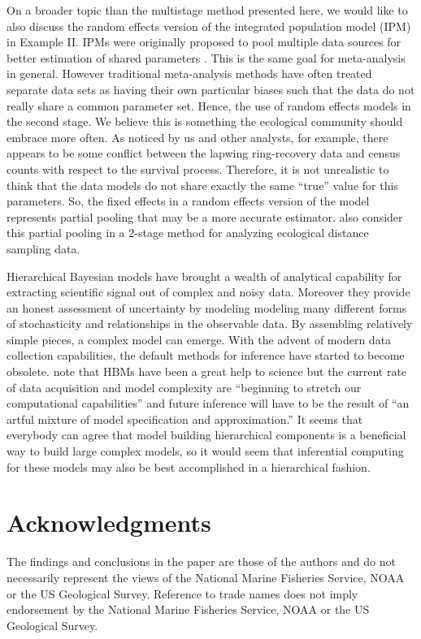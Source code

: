 \documentclass[12pt]{article}
\begin{document}
On a broader topic than the multistage method presented here, we would like to also discuss the random effects version of the integrated population model (IPM) in Example II. IPMs were originally proposed to pool 
multiple data sources for better estimation of shared parameters \citep{schaub2011integrated}. This is the same goal for meta-analysis in general. However traditional meta-analysis methods have often treated separate data sets as having their own particular biases such that the data do not really share a common parameter set. Hence, the use of random effects models in the second stage. We believe this is something the ecological community should embrace more often. As noticed by us and other analysts, for example, there appears to be some conflict between the lapwing ring-recovery data and census counts with respect to the survival process. Therefore, it is not unrealistic to think that the data models do not share exactly the same ``true'' value for this parameters. So, the fixed effects in a random effects version of the model represents partial pooling that may be a more accurate estimator. \cite{bravington2018reliable} also consider this partial pooling in a 2-stage method for analyzing ecological distance sampling data. 

Hierarchical Bayesian models have brought a wealth of analytical capability for extracting scientific signal out of complex and noisy data. Moreover they provide an honest assessment of uncertainty by modeling modeling many different forms of stochasticity and relationships in the observable data. By assembling relatively simple pieces, a complex model can emerge. With the advent of modern data collection capabilities, the default methods for inference have started to become obsolete. \citet{gelfand2015hierarchical} note that HBMs have been a great help to science but the current rate of data acquisition and model complexity are ``beginning to stretch our computational capabilities'' and future inference will have to be the result of ``an artful mixture of model specification and approximation.'' It seems that everybody can agree that model building hierarchical components is a beneficial way to build large complex models, so it would seem that inferential computing for these models may also be best accomplished in a hierarchical fashion. 




\section*{Acknowledgments}
The findings and conclusions in the paper are those of the authors and do not necessarily represent the views of the National Marine Fisheries Service, NOAA or the US Geological Survey. Reference to trade names does not imply endorsement by the National Marine Fisheries Service, NOAA or the US Geological Survey.
\end{document}
